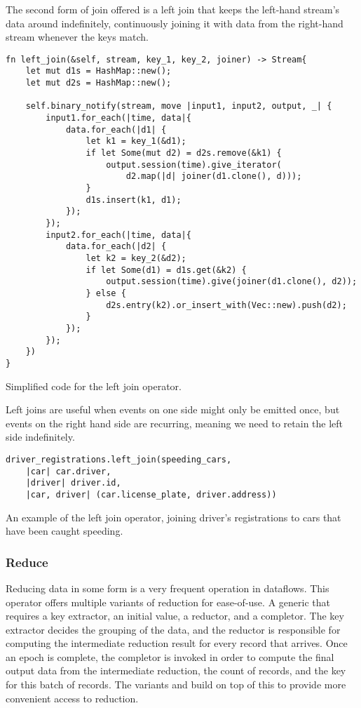 The second form of join offered is a left join that keeps the left-hand stream's data around indefinitely, continuously joining it with data from the right-hand stream whenever the keys match.

\begin{listing}[H]
\begin{verbatim}
fn left_join(&self, stream, key_1, key_2, joiner) -> Stream{
    let mut d1s = HashMap::new();
    let mut d2s = HashMap::new();

    self.binary_notify(stream, move |input1, input2, output, _| {
        input1.for_each(|time, data|{
            data.for_each(|d1| {
                let k1 = key_1(&d1);
                if let Some(mut d2) = d2s.remove(&k1) {
                    output.session(time).give_iterator(
                        d2.map(|d| joiner(d1.clone(), d)));
                }
                d1s.insert(k1, d1);
            });
        });
        input2.for_each(|time, data|{
            data.for_each(|d2| {
                let k2 = key_2(&d2);
                if let Some(d1) = d1s.get(&k2) {
                    output.session(time).give(joiner(d1.clone(), d2));
                } else {
                    d2s.entry(k2).or_insert_with(Vec::new).push(d2);
                }
            });
        });
    })
}
\end{verbatim}
  \caption{Simplified code for the left join operator.}
  \label{lst:left-join}
\end{listing}

Left joins are useful when events on one side might only be emitted once, but events on the right hand side are recurring, meaning we need to retain the left side indefinitely.

\begin{listing}[H]
\begin{verbatim}
driver_registrations.left_join(speeding_cars,
    |car| car.driver,
    |driver| driver.id,
    |car, driver| (car.license_plate, driver.address))
\end{verbatim}
\caption{An example of the left join operator, joining driver's registrations to cars that have been caught speeding.}
\label{lst:left-join-example}
\end{listing}

\subsubsection{Reduce}
Reducing data in some form is a very frequent operation in dataflows. This operator offers multiple variants of reduction for ease-of-use. A generic  that requires a key extractor, an initial value, a reductor, and a completor. The key extractor decides the grouping of the data, and the reductor is responsible for computing the intermediate reduction result for every record that arrives. Once an epoch is complete, the completor is invoked in order to compute the final output data from the intermediate reduction, the count of records, and the key for this batch of records. The variants  and  build on top of this to provide more convenient access to reduction.

